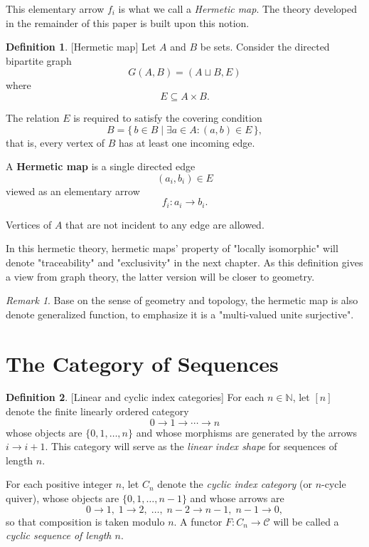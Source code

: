 \documentclass[11pt]{book}
\theoremstyle{definition}
\newtheorem{definition}{Definition}[section]
\theoremstyle{plain}
\theoremstyle{remark}
\newtheorem*{remark}{Remark}
\begin{document}
This elementary arrow $f_i$ is what we call a \emph{Hermetic map}. 
The theory developed in the remainder of this paper is built upon this notion.

\begin{definition}\label{def:Hermetic map}[Hermetic map]
Let $A$ and $B$ be sets. Consider the directed bipartite graph
\[
G(A,B)=(A\sqcup B,E)
\]
where
\[
E\subseteq A\times B .
\]

The relation $E$ is required to satisfy the covering condition
\[
B=\{\,b\in B\mid \exists a\in A:(a,b)\in E\,\},
\]
that is, every vertex of $B$ has at least one incoming edge.

A \textbf{Hermetic map} is a single directed edge
\[
(a_i,b_i)\in E
\]
viewed as an elementary arrow
\[
f_i:a_i\to b_i.
\]

Vertices of $A$ that are not incident to any edge are allowed.
\end{definition}


In this hermetic theory,  hermetic maps' property of "locally isomorphic" will denote "traceability" and "exclusivity" in the next chapter.
As this definition gives a view from graph theory, the latter version will be closer to geometry. 

\begin{remark}
Base on the sense of geometry and topology, the hermetic map is also denote generalized function, 
to emphasize it is a "multi-valued unite surjective".
\end{remark}

\section{The Category of Sequences}

\begin{definition}\label{def:Index Cat}[Linear and cyclic index categories]
For each $n\in\mathbb N$, let $[n]$ denote the finite linearly ordered category
\[
0 \longrightarrow 1 \longrightarrow \cdots \longrightarrow n
\]
whose objects are $\{0,1,\dots,n\}$ and whose morphisms are generated by the arrows $i\to i+1$.
This category will serve as the \emph{linear index shape} for sequences of length $n$.

For each positive integer $n$, let $C_n$ denote the \emph{cyclic index category} (or $n$-cycle quiver),
whose objects are $\{0,1,\dots,n-1\}$ and whose arrows are
\[
0\to1,\; 1\to2,\; \dots,\; n-2\to n-1,\; n-1\to0,
\]
so that composition is taken modulo $n$.
A functor $F:C_n\to\mathcal C$ will be called a \emph{cyclic sequence of length $n$}.
\end{definition}
\end{document}
